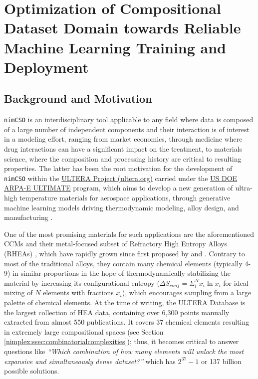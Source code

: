 \chapter{Optimization of Compositional Dataset Domain towards Reliable Machine Learning Training and Deployment} \label{chap:nimcso}

\section{Background and Motivation} \label{nimcso:sec:background}

\texttt{nimCSO} is an interdisciplinary tool applicable to any field
where data is composed of a large number of independent components and
their interaction is of interest in a modeling effort, ranging from
market economics, through medicine where drug interactions can have a
significant impact on the treatment, to materials science, where the
composition and processing history are critical to resulting properties.
The latter has been the root motivation for the development of
\texttt{nimCSO} within the \href{https://ultera.org}{ULTERA Project
(ultera.org)} carried under the
\href{https://arpa-e.energy.gov/?q=arpa-e-programs/ultimate}{US DOE
ARPA-E ULTIMATE} program, which aims to develop a new generation of
ultra-high temperature materials for aerospace applications, through
generative machine learning models \cite{Debnath2021} driving
thermodynamic modeling, alloy design, and manufacturing \cite{Li2024}.

One of the most promising materials for such applications are the
aforementioned CCMs and their metal-focused subset of Refractory High
Entropy Alloys (RHEAs) \cite{Senkov2018}, which have rapidly grown since first proposed by
\citet{Cantor2004} and
\citet{Yeh2004}. Contrary to most of
the traditional alloys, they contain many chemical elements (typically
4-9) in similar proportions in the hope of thermodynamically stabilizing
the material by increasing its configurational entropy
(\(\Delta S_{conf} = \Sigma_i^N x_i \ln{x_i}\) for ideal mixing of \(N\)
elements with fractions \(x_i\)), which encourages sampling from a large
palette of chemical elements. At the time of writing, the ULTERA
Database is the largest collection of HEA data, containing over 6,300
points manually extracted from almost 550 publications. It covers 37
chemical elements resulting in extremely large compositional spaces (see Section \ref{nimplex:ssec:combinatorialcomplexities});
thus, it becomes critical to answer questions like \emph{``Which
combination of how many elements will unlock the most expansive and
simultaneously dense dataset?''} which has \(2^{37}-1\) or 137 billion
possible solutions.

